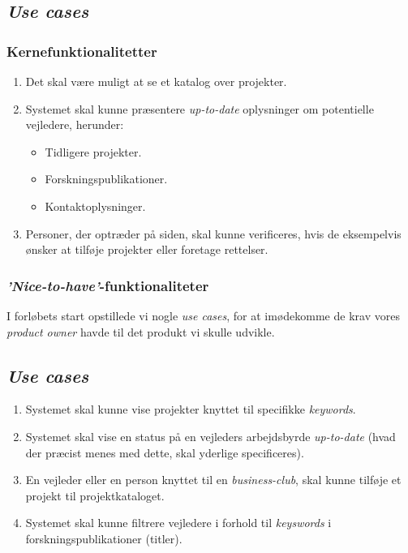 \documentclass[12pt]{article}
\begin{document}
\subsection{\textit{Use cases}}
\label{sec:krav}

\subsubsection{Kernefunktionalitetter}
\begin{enumerate}
	\item Det skal være muligt at se et katalog over projekter.
	\item Systemet skal kunne præsentere \textit{up-to-date} oplysninger om potentielle vejledere, herunder:
	\begin{itemize}
		\item Tidligere projekter.
		\item Forskningspublikationer.
		\item Kontaktoplysninger.
	\end{itemize}
	\item Personer, der optræder på siden, skal kunne verificeres, hvis de eksempelvis ønsker at tilføje projekter eller foretage rettelser.
\end{enumerate}

\subsubsection{\textit{'Nice-to-have'}-funktionaliteter}
\label{sec:krav}
I forløbets start opstillede vi nogle \textit{use cases}, for at imødekomme de krav vores \textit{product owner} havde til det produkt vi skulle udvikle.

\subsection{\textit{Use cases}}
\begin{enumerate}
  \item Systemet skal kunne vise projekter knyttet til specifikke \textit{keywords}.

  \item Systemet skal vise en status på en vejleders arbejdsbyrde \textit{up-to-date} (hvad der præcist menes med dette, skal yderlige specificeres).
  \item En vejleder eller en person knyttet til en \textit{business-club}, skal kunne tilføje et projekt til projektkataloget.

	\item Systemet skal kunne filtrere vejledere i forhold til \textit{keyswords} i forskningspublikationer (titler).
\end{enumerate}
\end{document}
